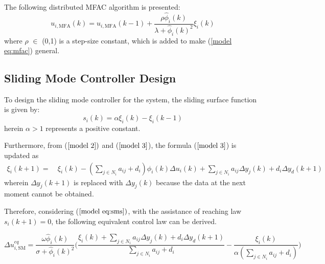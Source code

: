 \documentclass[journal,onecolumn]{IEEEtran}
\begin{document}
The following distributed MFAC algorithm is presented:
\begin{equation}
    \label{model eq:mfac}
    u_{i,\text{MFA}}(k) = u_{i,\text{MFA}}(k - 1) + \frac{\rho \hat{\phi}_i(k)}{\lambda + \hat{\phi}_i(k)^2} \xi_i(k)
\end{equation}
where \(\rho\) \(\in\) (0,1) is a step-size constant, which is added to make (\ref{model eq:mfac}) general. 

\subsection{Sliding Mode Controller Design}

To design the sliding mode controller for the system, the sliding surface function is given by:
\begin{equation}
    \label{model eq:sms}
    s_i(k) = \alpha \xi_i(k) - \xi_i(k-1)
\end{equation}
herein $ \alpha > 1$ represents a positive constant.

Furthermore, from ($ \ref{model 2}) $ and ($ \ref{model 3} $), the formula ($ \ref{model 3} $) is updated as
\begin{align}
    \label{model eq:xi_next}
    \xi_i(k+1) =\ & \xi_i(k) - (\sum_{j \in N_i} a_{ij} + d_i ) \phi_i(k) \Delta u_i(k) + \sum_{j \in N_i} a_{ij} \Delta y_j(k) + d_i \Delta y_d(k+1)
\end{align}
wherein $\Delta y_j(k+1)$ is replaced with $ \Delta y_j(k) $ because the data at the next moment cannot be obtained.




Therefore, considering ($ \ref{model eq:sms}) $, with the assistance of reaching law $ s_i(k+1) = 0 $, the following equivalent control law can be derived.

\begin{equation}
    \label{model eq:equivalent_control}
    \Delta u_{i,\text{SM}}^{eq} = \frac{\omega \hat{\phi}_i(k)}{\sigma + \hat{\phi}_i(k)^2}\bigg(\frac{\xi_i(k)+ \sum_{j \in N_i}a_{ij} \Delta y_j(k) + d_i \Delta y_d(k+1)}{\displaystyle \sum_{j \in N_i}a_{ij}+d_i} - \frac{\xi_i(k)}{\alpha(\displaystyle \sum_{j \in N_i}a_{ij}+d_i)} 
    \bigg)
\end{equation}
\end{document}
